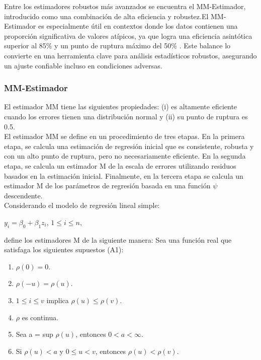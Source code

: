 Entre los estimadores robustos más avanzados se encuentra el MM-Estimador, introducido como una combinación de alta eficiencia y robustez.El MM-Estimador es especialmente útil en contextos donde los datos contienen una proporción significativa de valores atípicos, ya que logra una eficiencia asintótica superior al 85\% y un punto de ruptura máximo del 50\% \parencite{rousseeuw-yohai-1984}. Este balance lo convierte en una herramienta clave para análisis estadísticos robustos, asegurando un ajuste confiable incluso en condiciones adversas.\\



\subsubsection{MM-Estimador \parencite{yohai-1987}}
El estimador MM tiene las siguientes propiedades: (i) es altamente eficiente cuando los errores tienen una distribución normal y (ii) su punto de ruptura es 0.5.\\

El estimador MM se define en un procedimiento de tres etapas. En la primera etapa, se calcula una estimación de regresión inicial que es consistente, robusta y con un alto punto de ruptura, pero no necesariamente eficiente. En la segunda etapa, se calcula un estimador M de la escala de errores utilizando residuos basados en la estimación inicial. Finalmente, en la tercera etapa se calcula un estimador M de los parámetros de regresión basada en una función $\psi$ descendente.\\

Considerando el modelo de regresión lineal simple:
\begin{center}
$y_{i}= \beta_{0} + \beta_{1}z_{i}$, $1 \leq i \leq n, $
\end{center}

\textcite{huber-1981} define los estimadores M de la siguiente manera: Sea una función real que satisfaga los siguientes supuestos (A1):

\begin{enumerate}[label=\roman*.]
	\item $\rho(0) = 0$.
	\item   $\rho(-u) =  \rho(u)$.
	\item $1 \leq i \leq v$ implica $\rho(u) \leq  \rho(v)$.
	\item $\rho$ es continua.
	\item Sea a = sup $\rho(u)$, entonces $0<a< \infty$.
	\item Si $\rho(u) < a $ y $0 \leq  u < v $, entonces  $\rho(u) <  \rho(v)$.
\end{enumerate}

